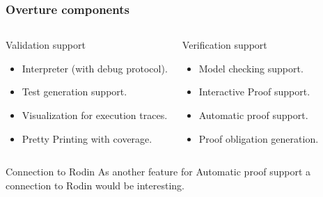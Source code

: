 \documentclass[slidestop,uncompress,mathserif,notes]{beamer}
\begin{document}
\begin{frame}
	\frametitle{Overture components}
	\begin{columns}
			\begin{block}{Validation support}
				{\scriptsize\begin{itemize}
				  \item Interpreter (with debug protocol).
				  \item Test generation support.
				  \item Visualization for execution traces.      
				  \item Pretty Printing with coverage.
				\end{itemize}}
			\end{block}
			\begin{block}{Verification support}
				{\scriptsize\begin{itemize}
				  \item Model checking support.
				  \item Interactive Proof support.
				  \item Automatic proof support.      
				  \item Proof obligation generation.
				\end{itemize}}
			\end{block}
		\end{columns}

%
%
%
%

\begin{beamerboxesrounded}[upper=uppercol,lower=lowercol,shadow=true]{Connection to Rodin}
As another feature for Automatic proof support a connection to Rodin would be interesting.
\end{beamerboxesrounded}

\end{frame}
\end{document}
